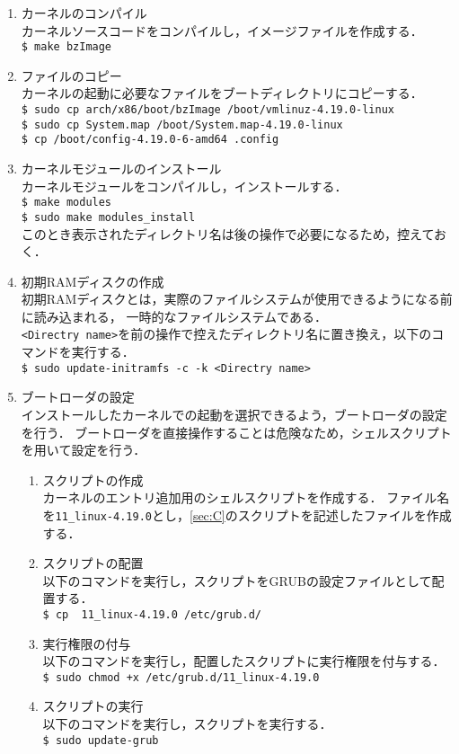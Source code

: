 \documentclass[12pt]{jsarticle}
\begin{document}
\begin{enumerate}
  \item カーネルのコンパイル\\
        カーネルソースコードをコンパイルし，イメージファイルを作成する．\\
        \verb|$ make bzImage|
  \item ファイルのコピー\\
        カーネルの起動に必要なファイルをブートディレクトリにコピーする．\\
        \verb|$ sudo cp arch/x86/boot/bzImage /boot/vmlinuz-4.19.0-linux|\\
        \verb|$ sudo cp System.map /boot/System.map-4.19.0-linux|\\
        \verb|$ cp /boot/config-4.19.0-6-amd64 .config|
  \item カーネルモジュールのインストール\\
        カーネルモジュールをコンパイルし，インストールする．\\
        \verb|$ make modules|\\
        \verb|$ sudo make modules_install|\\
        このとき表示されたディレクトリ名は後の操作で必要になるため，控えておく．
  \item 初期RAMディスクの作成\\
        初期RAMディスクとは，実際のファイルシステムが使用できるようになる前に読み込まれる，
        一時的なファイルシステムである．\\
        \verb|<Directry name>|を前の操作で控えたディレクトリ名に置き換え，以下のコマンドを実行する．\\
        \verb|$ sudo update-initramfs -c -k <Directry name>|
  \item ブートローダの設定\\
  インストールしたカーネルでの起動を選択できるよう，ブートローダの設定を行う．
  ブートローダを直接操作することは危険なため，シェルスクリプトを用いて設定を行う．
  \begin{enumerate}
    \item スクリプトの作成\\
    カーネルのエントリ追加用のシェルスクリプトを作成する．
    ファイル名を\verb|11_linux-4.19.0|とし，\ref{sec:C}のスクリプトを記述したファイルを作成する．
    \item スクリプトの配置\\
    以下のコマンドを実行し，スクリプトをGRUBの設定ファイルとして配置する．\\
    \verb|$ cp  11_linux-4.19.0 /etc/grub.d/|
    \item 実行権限の付与\\
    以下のコマンドを実行し，配置したスクリプトに実行権限を付与する．\\
    \verb|$ sudo chmod +x /etc/grub.d/11_linux-4.19.0|
    \item スクリプトの実行\\
    以下のコマンドを実行し，スクリプトを実行する．\\
    \verb|$ sudo update-grub|
  \end{enumerate}
\end{enumerate}
\end{document}
